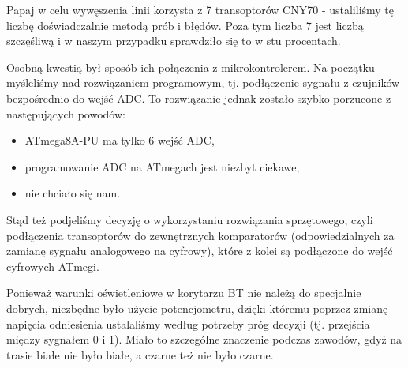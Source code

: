 Papaj w celu wywęszenia linii korzysta z 7 transoptorów CNY70 - ustaliliśmy tę liczbę doświadczalnie metodą prób i błędów. Poza tym liczba 7 jest liczbą szczęśliwą i w naszym przypadku sprawdziło się to w stu procentach.

Osobną kwestią był sposób ich połączenia z mikrokontrolerem. Na początku myśleliśmy nad rozwiązaniem programowym, tj. podłączenie sygnału z czujników bezpośrednio do wejść ADC. To rozwiązanie jednak zostało szybko porzucone z następujących powodów:
\begin{itemize}
\item ATmega8A-PU ma tylko 6 wejść ADC,
\item programowanie ADC na ATmegach jest niezbyt ciekawe,
\item nie chciało się nam.
\end{itemize}

Stąd też podjeliśmy decyzję o wykorzystaniu rozwiązania sprzętowego, czyli podłączenia transoptorów do zewnętrznych komparatorów (odpowiedzialnych za zamianę sygnału analogowego na cyfrowy), które z kolei są podłączone do wejść cyfrowych ATmegi. 

Ponieważ warunki oświetleniowe w korytarzu BT nie należą do specjalnie dobrych, niezbędne było użycie potencjometru, dzięki któremu poprzez zmianę napięcia odniesienia ustalaliśmy według potrzeby próg decyzji (tj. przejścia między sygnałem 0 i 1). Miało to szczególne znaczenie podczas zawodów, gdyż na trasie białe nie było białe, a czarne też nie było czarne. 
